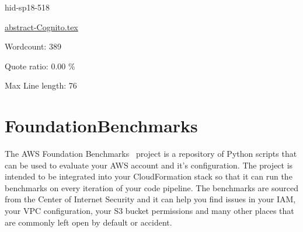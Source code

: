 


\begin{IU}

hid-sp18-518

\href{https://github.com/cloudmesh-community/hid-sp18-518/blob/master//technology/abstract-Cognito.tex}{abstract-Cognito.tex}

 

Wordcount: 389


Quote ratio: 0.00 \%
 
Max Line length: 76
\end{IU}

\section{FoundationBenchmarks}

The AWS Foundation Benchmarks~\cite{hid-sp18-518-FoundationBenchmarks} project
is a repository of Python scripts that can be used to evaluate your AWS
account and it's configuration. The project is intended to be integrated
into your CloudFormation stack so that it can run the benchmarks on every
iteration of your code pipeline. The benchmarks are sourced from the Center
of Internet Security and it can help you find issues in your IAM, your VPC
configuration, your S3 bucket permissions and many other places that are
commonly left open by default or accident.





